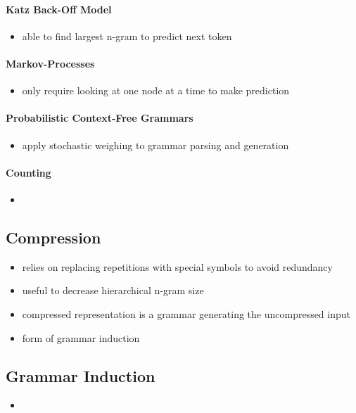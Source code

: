 \documentclass[10pt]{report}
\begin{document}
\paragraph{Katz Back-Off Model}
\begin{itemize}
    \item able to find largest n-gram to predict next token
\end{itemize}
\paragraph{Markov-Processes}
\begin{itemize}
    \item only require looking at one node at a time to make prediction
\end{itemize}
\paragraph{Probabilistic Context-Free Grammars}
\begin{itemize}
    \item apply stochastic weighing to grammar parsing and generation
\end{itemize}
\paragraph{Counting}
\begin{itemize}
    \item 
\end{itemize}
\subsection{Compression}
\begin{itemize}
    \item relies on replacing repetitions with special symbols to avoid redundancy
    \item useful to decrease hierarchical n-gram size
    \item compressed representation is a grammar generating the uncompressed input
    \item form of grammar induction
\end{itemize}
\subsection{Grammar Induction}
\begin{itemize}
    \item
\end{itemize}
\end{document}
